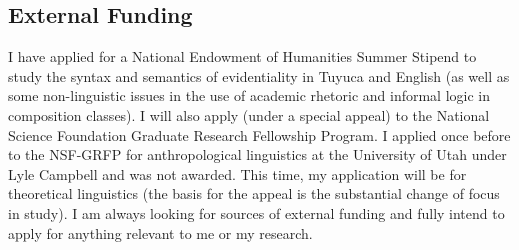 \documentclass[11pt]{article}
\begin{document}
\subsection{External Funding}
I have applied for a National Endowment of Humanities Summer Stipend to study the syntax and semantics of evidentiality in Tuyuca and English (as well as some non-linguistic issues in the use of academic rhetoric and informal logic in composition classes). I will also apply (under a special appeal) to the National Science Foundation Graduate Research Fellowship Program. I applied once before to the NSF-GRFP for anthropological linguistics at the University of Utah under Lyle Campbell and was not awarded. This time, my application will be for theoretical linguistics (the basis for the appeal is the substantial change of focus in study). I am always looking for sources of external funding and fully intend to apply for anything relevant to me or my research. 
\end{document}
